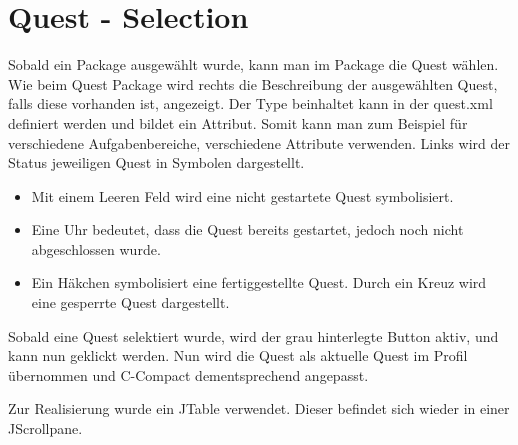\section{Quest - Selection}

Sobald ein Package ausgewählt wurde, kann man im Package die Quest wählen. Wie beim Quest Package wird rechts die Beschreibung der ausgewählten Quest, falls diese vorhanden ist, angezeigt. Der Type beinhaltet kann in der quest.xml definiert werden und bildet ein Attribut. Somit kann man zum Beispiel für verschiedene Aufgabenbereiche, verschiedene Attribute verwenden. Links wird der Status jeweiligen Quest in Symbolen dargestellt.

\begin{itemize}
\item Mit einem Leeren Feld wird eine nicht gestartete Quest symbolisiert.
\item Eine Uhr bedeutet, dass die Quest bereits gestartet, jedoch noch nicht abgeschlossen wurde.
\item Ein Häkchen symbolisiert eine fertiggestellte Quest.
Durch ein Kreuz wird eine gesperrte Quest dargestellt. 
\end{itemize}
Sobald eine Quest selektiert wurde, wird der grau hinterlegte Button aktiv, und kann nun geklickt werden. Nun wird die Quest als aktuelle Quest im Profil übernommen und C-Compact dementsprechend angepasst.

Zur Realisierung wurde ein JTable verwendet. Dieser befindet sich wieder in einer JScrollpane.

